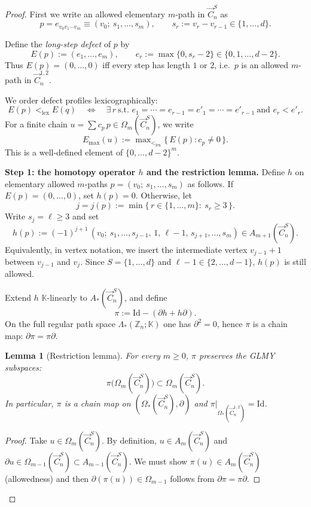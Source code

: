 \documentclass[11pt]{amsart}
\newcommand{\Z}{\mathbb Z}
\newcommand{\K}{\mathbb K}
\theoremstyle{plain}
\newtheorem{lemma}[theorem]{Lemma}
\theoremstyle{definition}
\numberwithin{equation}{section}
\begin{document}
\begin{proof} 
First we write an allowed elementary $m$-path in $\vec{C}_n^S$ as
\[
p=e_{v_0v_1\cdots v_m}\equiv (v_0;~ s_1,\dots,s_m),
\qquad s_r:=v_r-v_{r-1}\in\{1,\dots,d\}.
\]

\medskip
Define the \emph{long-step defect} of $p$ by
\[
E(p):=(e_1,\dots,e_m),\qquad e_r:=\max\{0,s_r-2\}\in\{0,1,\dots,d-2\}.
\]
Thus $E(p)=(0,\dots,0)$ iff every step has length $1$ or $2$, i.e.\ $p$ is an allowed $m$-path in $\vec{C}_n^{1,2}$.

We order defect profiles lexicographically:
\[
E(p)<_{\mathrm{lex}}E(q)\quad\Longleftrightarrow\quad
\exists\,r\ \text{s.t. } e_1=\cdots=e_{r-1}=e'_1=\cdots=e'_{r-1}\ \text{and } e_r<e'_r.
\]
For a finite chain $u=\sum c_p\,p\in\Omega_m(\vec{C}_n^S)$, we write
\[
E_{\max}(u):=\max\nolimits_{<_{\mathrm{lex}}}\{\,E(p): c_p\neq 0\,\}.
\]
This is a well-defined element of $\{0,\dots,d-2\}^m$.

\medskip
\noindent\textbf{Step 1: the homotopy operator $h$ and the restriction lemma.}
Define $h$ on elementary allowed $m$-paths $p=(v_0;~s_1,\dots,s_m)$ as follows.
If $E(p)=(0,\dots,0)$, set $h(p)=0$.  Otherwise, let
\[
j=j(p):=\min\{\,r\in\{1,\dots,m\}:\ s_r\ge 3\,\}.
\]
Write $s_j=\ell\ge 3$ and set
\[
h(p):=(-1)^{j+1}\,(v_0;\ s_1,\dots,s_{j-1},\,1,\,\ell-1,\,s_{j+1},\dots,s_m)\in A_{m+1}(\vec{C}_n^S).
\]
Equivalently, in vertex notation, we insert the intermediate vertex $v_{j-1}+1$ between $v_{j-1}$ and $v_j$.
Since $S=\{1,\dots,d\}$ and $\ell-1\in\{2,\dots,d-1\}$, $h(p)$ is still allowed.

Extend $h$ $\K$-linearly to $A_*(\vec{C}_n^S)$, and define
\[
\pi:=\mathrm{Id}-(\partial h+h\partial).
\]
On the full regular path space $\Lambda_*(\Z_n;\K)$ one has $\partial^2=0$, hence $\pi$ is a chain map:
$\partial\pi=\pi\partial$.

\begin{lemma}[Restriction lemma]
For every $m\ge 0$, $\pi$ preserves the GLMY subspaces:
\[
\pi\bigl(\Omega_m(\vec{C}_n^S)\bigr)\subset \Omega_m(\vec{C}_n^S).
\]
In particular, $\pi$ is a chain map on $(\Omega_*(\vec{C}_n^S),\partial)$ and $\pi|_{\Omega_*(\vec{C}_n^{1,2})}=\mathrm{Id}$.
\end{lemma}

\begin{proof}
Take $u\in\Omega_m(\vec{C}_n^S)$.  By definition, $u\in A_m(\vec{C}_n^S)$ and $\partial u\in \Omega_{m-1}(\vec{C}_n^S)\subset A_{m-1}(\vec{C}_n^S)$.
We must show $\pi(u)\in A_m(\vec{C}_n^S)$ (allowedness) and then $\partial(\pi(u))\in \Omega_{m-1}$ follows from
$\partial\pi=\pi\partial$.


\end{proof}
\end{proof}
\end{document}
